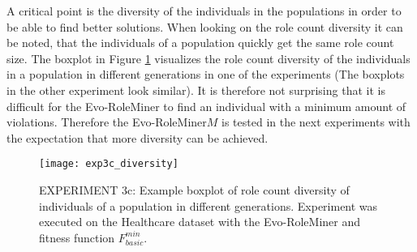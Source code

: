 A critical point is the diversity of the individuals in the populations in order to be able to find better solutions. When looking on the role count diversity it can be noted, that the individuals of a population quickly get the same role count size. The boxplot in Figure \ref{fig:exp3c_diversity} visualizes the role count diversity of the individuals in a population in different generations in one of the experiments (The boxplots in the other experiment look similar). It is therefore not surprising that it is difficult for the Evo-RoleMiner to find an individual with a minimum amount of violations. Therefore the Evo-RoleMiner$M$ is tested in the next experiments with the expectation that more diversity can be achieved.

\begin{figure}[H]
	\centering
	\texttt{[image: exp3c\_diversity]}
	\caption{EXPERIMENT 3c: Example boxplot of role count diversity of individuals of a population in different generations. Experiment was executed on the Healthcare dataset with the Evo-RoleMiner and fitness function $F_{basic}^{min}$.}
	\label{fig:exp3c_diversity}
\end{figure}